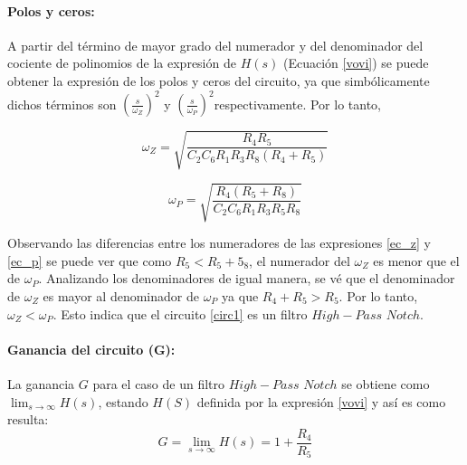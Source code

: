\paragraph*{Polos y ceros:}
A partir del t\'ermino de mayor grado del numerador y del denominador del cociente de polinomios de la expresi\'on de $H(s)$ (Ecuaci\'on \ref{vovi}) se puede obtener la expresi\'on de los polos y ceros del circuito, ya que simb\'olicamente dichos t\'erminos son $\left(\frac{s}{\omega_Z}\right)^2$ y $\left(\frac{s}{\omega_P}\right)^2$respectivamente. Por lo tanto,

\begin{equation}
	\omega_Z = \sqrt{\frac{R_4 R_5}{C_2 C_6 R_1 R_3 R_8 (R_4 + R_5)}}
	\label{ec_z}
\end{equation}

\begin{equation}
	\omega_P = \sqrt{\frac{R_4 (R_5 + R_8)}{C_2 C_6 R_1 R_3 R_5 R_8}}
	\label{ec_p}
\end{equation}

Observando las diferencias entre los numeradores de las expresiones \ref{ec_z} y \ref{ec_p} se puede ver que como $R_5 < R_5 + 5_8$, el numerador del $\omega_Z$ es menor que el de $\omega_P$. Analizando los denominadores de igual manera, se v\'e que el denominador de $\omega_Z$ es mayor al denominador de $\omega_P$ ya que $R_4 + R_5 > R_5$. Por lo tanto, $\omega_Z < \omega_P$. Esto indica que el circuito \ref{circ1} es un filtro $High-Pass$ $ Notch$.


\paragraph*{Ganancia del circuito (G):}  La ganancia $G$ para el caso de un filtro $High-Pass$ $ Notch$ se obtiene como $\lim_{s\to\infty}H(s)$, estando $H(S)$ definida por la expresi\'on \ref{vovi} y as\'i es como resulta:
 \begin{equation}
	G = \lim_{s\to\infty}H(s) = 1 + \frac{R_4}{R_5} 
\label{G}
\end{equation}
	
	
	
	
	
	